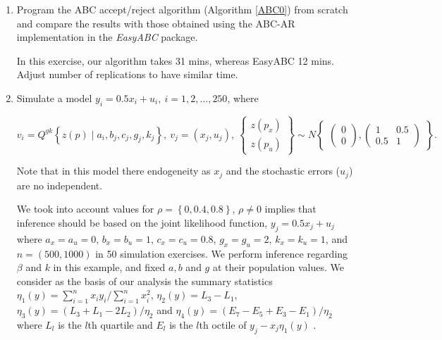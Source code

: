 \begin{enumerate}
	\item Program the ABC accept/reject algorithm (Algorithm \ref{ABC0}) from scratch and compare the results with those obtained using the ABC-AR implementation in the \textit{EasyABC} package.
	
	In this exercise, our algorithm takes 31 mins, whereas EasyABC 12 mins. Adjust number of replications to have similar time.
	
	\item Simulate a model $y_i=0.5 x_i+u_i, \ i=1,2,\dots,250$, where 
	
	$$v_i=Q^{gk}\left\{z(p)\mid a_i, b_j, c_j, g_j, k_j\right\}, \  v_j=(x_j,u_j), \ \begin{Bmatrix} z(p_x) \\ z(p_u)\end{Bmatrix}\sim N \begin{Bmatrix} \begin{pmatrix} 0\\ 0\end{pmatrix}, \begin{pmatrix} 1 & 0.5 \\ 0.5 & 1\end{pmatrix} \end{Bmatrix}.$$
	
	Note that in this model there endogeneity as $x_j$ and the stochastic errors ($u_j$) are no independent.
	
	We took into account values for $\rho =\left\{0,0.4,0.8\right\}$, $\rho\neq 0$ implies that inference should be based on the joint likelihood function, $y_{j}=0.5x_j+u_j$ where $a_x=a_u=0$, $b_x=b_u=1$, $c_x=c_u=0.8$, $g_x=g_u=2$, $k_x=k_u=1$, and $n=(500, 1000)$ in 50 simulation exercises. We perform inference regarding $\beta$ and $k$ in this example, and fixed $a, b$ and $g$ at their population values. We consider as the basis of our analysis the summary statistics $\eta_{1}({y})=\sum_{i=1}^{n}x_iy_i/\sum_{i=1}^{n}x_i^2$, $\eta_2({y})=L_3-L_1$, $\eta_3({y})=(L_3+L_1-2L_2)/\eta_2$  and $\eta_4({y})=(E_7-E_5+E_3-E_1)/\eta_2$ where $L_l$ is the $l$th quartile and $E_l$ is the $l$th octile of $y_j-x_j\eta_1({y})$ \cite{drovandi2011likelihood}.
	
\end{enumerate}

